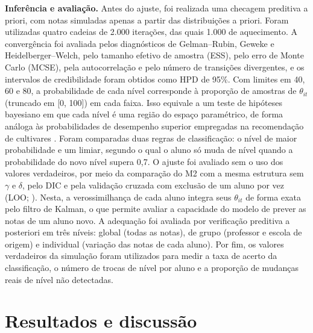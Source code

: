 \documentclass[12pt,a4paper]{article}
\begin{document}
\textbf{Inferência e avaliação.} Antes do ajuste, foi realizada uma checagem preditiva a
priori, com notas simuladas apenas a partir das distribuições a priori. Foram utilizadas quatro
cadeias de 2.000 iterações, das quais 1.000 de aquecimento. A convergência foi avaliada pelos
diagnósticos de Gelman--Rubin, Geweke e Heidelberger--Welch, pelo tamanho efetivo de amostra
(ESS), pelo erro de Monte Carlo (MCSE), pela autocorrelação e pelo número de transições
divergentes, e os intervalos de credibilidade foram obtidos como HPD de 95\%. Com limites em
40, 60 e 80, a probabilidade de cada nível corresponde à proporção de amostras de
$\theta_{it}$ (truncado em [0, 100]) em cada faixa. Isso equivale a um teste de hipóteses
bayesiano em que cada nível é uma região do espaço paramétrico, de forma análoga às
probabilidades de desempenho superior empregadas na recomendação de cultivares
\citep{dias2022}. Foram comparadas duas regras de classificação: o nível de maior
probabilidade e um limiar, segundo o qual o aluno só muda de nível quando a probabilidade do
novo nível supera 0,7. O ajuste foi avaliado sem o uso dos valores verdadeiros, por meio da
comparação do M2 com a mesma estrutura sem $\gamma$ e $\delta$, pelo DIC
\citep{spiegelhalter2002} e pela validação cruzada com exclusão de um aluno por vez (LOO;
\citealp{vehtari2017}). Nesta, a verossimilhança de cada aluno integra seus $\theta_{it}$ de
forma exata pelo filtro de Kalman, o que permite avaliar a capacidade do modelo de prever as
notas de um aluno novo. A adequação foi avaliada por verificação preditiva a posteriori em três
níveis: global (todas as notas), de grupo (professor e escola de origem) e individual (variação
das notas de cada aluno). Por fim, os valores verdadeiros da simulação foram utilizados para
medir a taxa de acerto da classificação, o número de trocas de nível por aluno e a proporção
de mudanças reais de nível não detectadas.

\section{Resultados e discussão}
\end{document}
